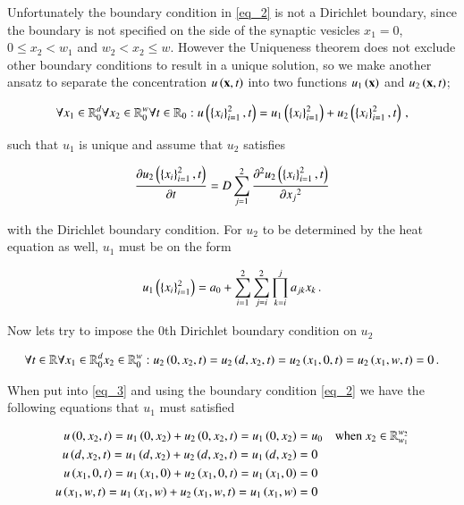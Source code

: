 \documentclass[11pt,english,a4paper]{article}
\begin{document}
\begin{flushleft}
Unfortunately the boundary condition in \eqref{eq_2} is not a Dirichlet boundary, since the boundary is not specified on the side of the synaptic vesicles $x_1=0$, $0\leq x_2 < w_1$ and $w_2 < x_2 \leq w$. However the Uniqueness theorem does not exclude other boundary conditions to result in a unique solution, so we make another ansatz to separate the concentration $u\left({\textbf{x},t}\right)$ into two functions $u_1\left({\textbf{x}}\right)$ and $u_2\left({\textbf{x},t}\right)$;

\begin{align}
\forall x_1 \in \mathbb{R}_0^d \forall x_2 \in \mathbb{R}_0^w \forall t \in \mathbb{R}_{0}: u\left({\left\lbrace{x_i}\right\rbrace_{i=1}^2,t}\right) = u_1\left({\left\lbrace{x_i}\right\rbrace_{i=1}^2}\right) + u_2\left({\left\lbrace{x_i}\right\rbrace_{i=1}^2,t}\right) \,,
\label{eq_3}
\end{align}

such that $u_1$ is unique and assume  that $u_2$ satisfies

\begin{align}
\frac{\partial u_2\left({\left\lbrace{x_i}\right\rbrace_{i=1}^2,t}\right)}{\partial t} = D\sum_{j=1}^2\frac{\partial^2 u_2\left({\left\lbrace{x_i}\right\rbrace_{i=1}^2,t}\right)}{\partial {x_j}^2}
\label{eq_4}
\end{align}

with the Dirichlet boundary condition. For $u_2$ to be determined by the heat equation as well, $u_1$ must be on the form

\begin{align}
u_1\left({\left\lbrace{x_i}\right\rbrace_{i=1}^2}\right) = a_0 + \sum_{i=1}^2\sum_{j=i}^2\prod_{k=i}^j a_{jk} x_k \,.
\label{eq_5}
\end{align}

Now lets try to impose the 0th Dirichlet boundary condition on $u_2$

\begin{align}
\forall t \in \mathbb{R} \forall x_1 \in \mathbb{R}_0^d x_2 \in \mathbb{R}_0^w : u_2\left({0,x_2,t}\right)=u_2\left({d,x_2,t}\right)=u_2\left({x_1,0,t}\right)=u_2\left({x_1,w,t}\right)=0\,.
\label{eq_6}
\end{align}

When put into \eqref{eq_3} and using the boundary condition \eqref{eq_2} we have the following equations that $u_1$ must satisfied

\begin{align*}
u\left({0,x_2,t}\right) = u_1\left({0,x_2}\right) + u_2\left({0,x_2,t}\right) = u_1\left({0,x_2}\right) &= u_0 \quad \text{when } x_2\in\mathbb{R}_{w_1}^{w_2} 
\\
u\left({d,x_2,t}\right) = u_1\left({d,x_2}\right) + u_2\left({d,x_2,t}\right) = u_1\left({d,x_2}\right) &= 0
\\
u\left({x_1,0,t}\right) = u_1\left({x_1,0}\right) + u_2\left({x_1,0,t}\right) = u_1\left({x_1,0}\right) &= 0
\\
u\left({x_1,w,t}\right) = u_1\left({x_1,w}\right) + u_2\left({x_1,w,t}\right) = u_1\left({x_1,w}\right) &= 0
\end{align*}


\end{flushleft}
\end{document}
